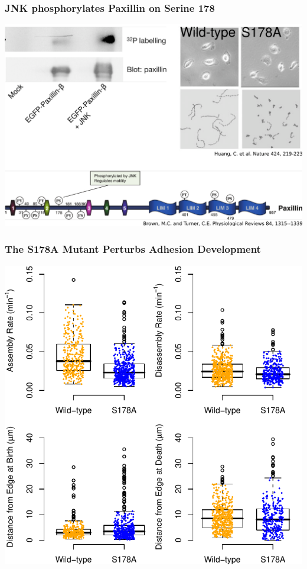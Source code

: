 \documentclass{beamer}
\begin{document}
\begin{frame}
	\frametitle{JNK phosphorylates Paxillin on Serine 178}
	\includegraphics[height=0.8\textheight]{figures/S178A/verification/all}
\end{frame}

\begin{frame}
	\frametitle{The S178A Mutant Perturbs Adhesion Development}
	\begin{center}
	\includegraphics[height=0.8\textheight]{figures/S178A/S178A_vs_wild-type}
	\end{center}
\end{frame}
\end{document}
